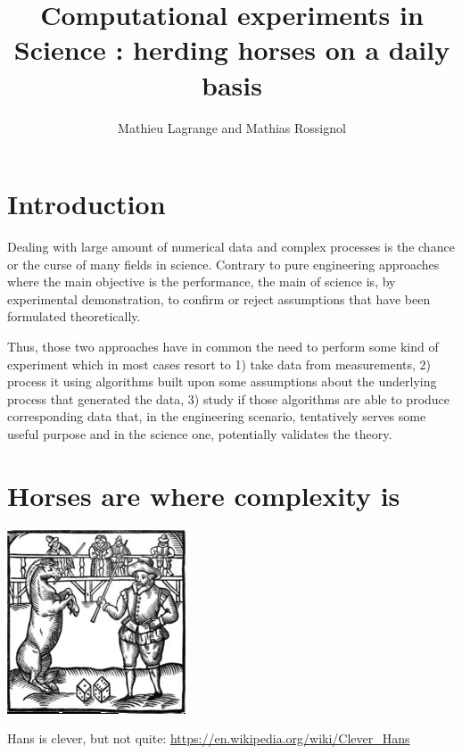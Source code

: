 \documentclass[a4paper,fleqn]{tufte-handout}
\title{Computational experiments in Science : herding horses on a daily basis}
\author{Mathieu Lagrange and Mathias Rossignol}
\begin{document}
\maketitle

\section{Introduction}

Dealing with large amount of numerical data and complex processes is the chance or the curse of many fields in science. Contrary to pure engineering approaches where the main objective is the performance, the main of science is, by experimental demonstration, to confirm or reject assumptions that have been formulated theoretically. 

Thus, those two approaches have in common the need to perform some kind of experiment which in most cases resort to 1) take data from measurements, 2) process it using algorithms built upon some assumptions about the underlying process that generated the data, 3) study if those algorithms are able to produce corresponding data that, in the engineering scenario, tentatively serves some useful purpose and in the science one, potentially validates the theory.


\section{Horses are where complexity is}

\begin{marginfigure}
\begin{center}
\includegraphics[width=\textwidth]{figures/hans} 
\end{center}
\caption{\label{fig:explanes} Hans is clever, but not quite: \url{https://en.wikipedia.org/wiki/Clever_Hans}}
\end{marginfigure}
\end{document}
